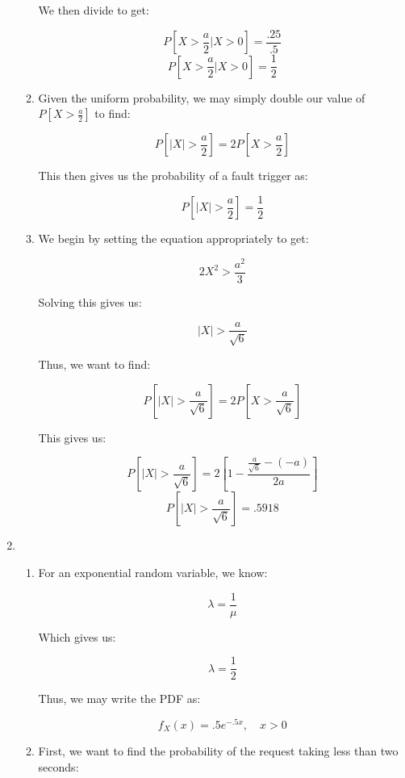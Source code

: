 \begin{enumerate}
\begin{enumerate}
        We then divide to get:

        $$P\left[X>\frac{a}{2}|X>0\right]=\frac{.25}{.5}$$
        $$\boxed{P\left[X>\frac{a}{2}|X>0\right]=\frac{1}{2}}$$

      \item Given the uniform probability, we may simply double our value of $P\left[ X>\frac{a}{2} \right]$ to find:

        $$P\left[ |X|>\frac{a}{2} \right]=2P\left[ X>\frac{a}{2} \right]$$

        This then gives us the probability of a fault trigger as:

        $$\boxed{P\left[ |X|>\frac{a}{2} \right]=\frac{1}{2}}$$

      \item We begin by setting the equation appropriately to get:

        $$2X^2>\frac{a^2}{3}$$

        Solving this gives us:

        $$|X|>\frac{a}{\sqrt{6}}$$

        Thus, we want to find:

        $$P\left[|X|>\frac{a}{\sqrt{6}}\right]=2P\left[ X>\frac{a}{\sqrt{6}} \right]$$

        This gives us:

        $$P\left[|X|>\frac{a}{\sqrt{6}}\right]=2\left[ 1-\frac{\frac{a}{\sqrt{6}}-(-a)}{2a} \right]$$
        $$\boxed{P\left[|X|>\frac{a}{\sqrt{6}}\right]=.5918}$$

    \end{enumerate}

    \setcounter{enumi}{5}

  \item

    \begin{enumerate}

      \item For an exponential random variable, we know:

        $$\lambda=\frac{1}{\mu}$$

        Which gives us:

        $$\lambda=\frac{1}{2}$$

        Thus, we may write the PDF as:

        $$\boxed{f_X(x)=.5e^{-.5x},\quad x>0}$$

      \item First, we want to find the probability of the request taking less than two seconds:


\end{enumerate}
\end{enumerate}
